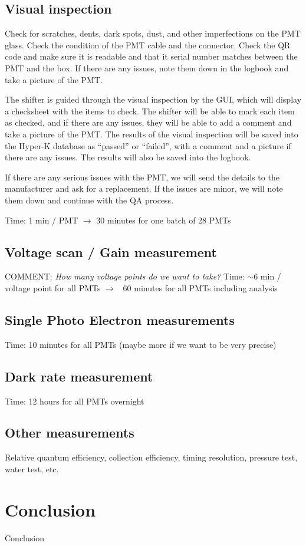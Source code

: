 \documentclass[12pt,a4paper]{article}
\newcommand{\note}[1]{\textcolor{green!70!black}{COMMENT: \textit{#1}}}
\begin{document}
\subsection{Visual inspection}
Check for scratches, dents, dark spots, dust, and other imperfections on the PMT glass. Check the condition of the PMT cable and the connector. Check the QR code and make sure it is readable and that it serial number matches between the PMT and the box. If there are any issues, note them down in the logbook and take a picture of the PMT.

The shifter is guided through the visual inspection by the GUI, which will display a checksheet with the items to check. The shifter will be able to mark each item as checked, and if there are any issues, they will be able to add a comment and take a picture of the PMT. The results of the visual inspection will be saved into the Hyper-K database as ``passed'' or ``failed'', with a comment and a picture if there are any issues. The results will also be saved into the logbook.

If there are any serious issues with the PMT, we will send the details to the manufacturer and ask for a replacement. If the issues are minor, we will note them down and continue with the QA process.

Time: 1 min / PMT $\rightarrow$ 30 minutes for one batch of 28 PMTs

\subsection{Voltage scan / Gain measurement}
\note{How many voltage points do we want to take?}
Time: $\sim$6 min / voltage point for all PMTs $\rightarrow$ ~60 minutes for all PMTs including analysis

\subsection{Single Photo Electron measurements}

Time: 10 minutes for all PMTs (maybe more if we want to be very precise)

\subsection{Dark rate measurement}

Time: 12 hours for all PMTs overnight

\subsection{Other measurements}
Relative quantum efficiency, collection efficiency, timing resolution, pressure test, water test, etc.

\section{Conclusion}
Conclusion

\FloatBarrier

%
\end{document}
